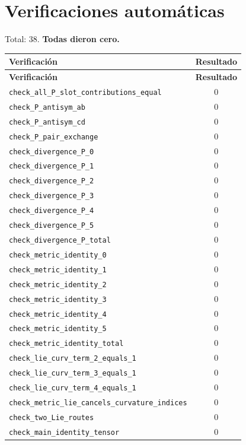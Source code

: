 \documentclass[11pt,a4paper]{article}
\begin{document}
\section*{Verificaciones automáticas}
Total: 38. \textbf{Todas dieron cero.}
\begin{longtable}{p{}c}
\toprule
\textbf{Verificación} & \textbf{Resultado}\\
\midrule
\endfirsthead
\toprule
\textbf{Verificación} & \textbf{Resultado}\\
\midrule
\endhead
\texttt{check\_all\_P\_slot\_contributions\_equal} & $0$\\
\texttt{check\_P\_antisym\_ab} & $0$\\
\texttt{check\_P\_antisym\_cd} & $0$\\
\texttt{check\_P\_pair\_exchange} & $0$\\
\texttt{check\_divergence\_P\_0} & $0$\\
\texttt{check\_divergence\_P\_1} & $0$\\
\texttt{check\_divergence\_P\_2} & $0$\\
\texttt{check\_divergence\_P\_3} & $0$\\
\texttt{check\_divergence\_P\_4} & $0$\\
\texttt{check\_divergence\_P\_5} & $0$\\
\texttt{check\_divergence\_P\_total} & $0$\\
\texttt{check\_metric\_identity\_0} & $0$\\
\texttt{check\_metric\_identity\_1} & $0$\\
\texttt{check\_metric\_identity\_2} & $0$\\
\texttt{check\_metric\_identity\_3} & $0$\\
\texttt{check\_metric\_identity\_4} & $0$\\
\texttt{check\_metric\_identity\_5} & $0$\\
\texttt{check\_metric\_identity\_total} & $0$\\
\texttt{check\_lie\_curv\_term\_2\_equals\_1} & $0$\\
\texttt{check\_lie\_curv\_term\_3\_equals\_1} & $0$\\
\texttt{check\_lie\_curv\_term\_4\_equals\_1} & $0$\\
\texttt{check\_metric\_lie\_cancels\_curvature\_indices} & $0$\\
\texttt{check\_two\_Lie\_routes} & $0$\\
\texttt{check\_main\_identity\_tensor} & $0$\\

\end{longtable}
\end{document}
